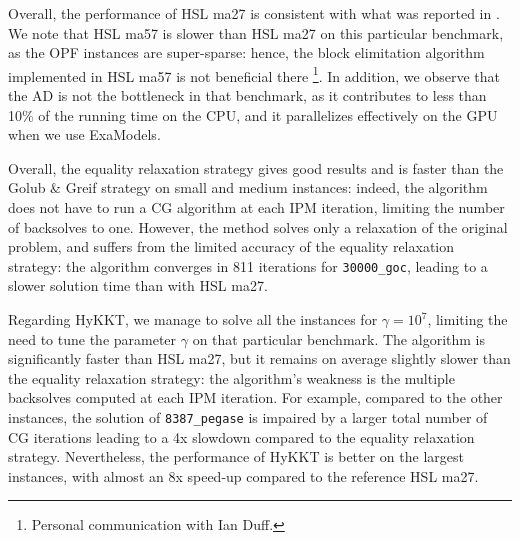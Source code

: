 Overall, the performance of HSL ma27 is consistent with what was reported
in \cite{babaeinejadsarookolaee2019power}. We note that HSL ma57 is slower
than HSL ma27 on this particular benchmark, as the OPF instances are super-sparse:
hence, the block elimitation algorithm implemented in HSL ma57 is not beneficial there
\footnote{Personal communication with Ian Duff.}. In addition, we observe that
the AD is not the bottleneck in that benchmark, as it contributes to less than 10\% of
the running time on the CPU, and it parallelizes effectively on the GPU when we use ExaModels.

Overall, the equality relaxation strategy gives good results and is faster than
the Golub \& Greif strategy on small and medium instances: indeed, the algorithm
does not have to run a CG algorithm at each IPM iteration, limiting the number
of backsolves to one. However, the method solves only a relaxation of the original
problem, and suffers from the limited accuracy of the equality relaxation strategy:
the algorithm converges in 811 iterations for {\tt 30000\_goc}, leading to a slower
solution time than with HSL ma27.

Regarding HyKKT, we manage to solve all the instances for $\gamma = 10^7$, limiting
the need to tune the parameter $\gamma$ on that particular benchmark. The algorithm
is significantly faster than HSL ma27, but it remains on average slightly slower
than the equality relaxation strategy: the algorithm's weakness is the multiple
backsolves computed at each IPM iteration. For example, compared
to the other instances, the solution of {\tt 8387\_pegase} is impaired
by a larger total number of CG iterations leading to a 4x slowdown compared
to the equality relaxation strategy.
Nevertheless, the performance of HyKKT is better on the largest instances,
with almost an 8x speed-up compared to the reference HSL ma27.

